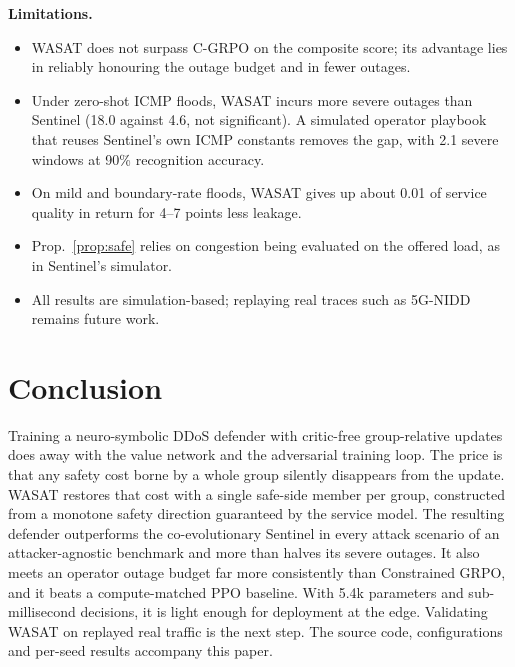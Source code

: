 \documentclass[conference]{IEEEtran}
\begin{document}
\textbf{Limitations.}
\begin{itemize}
\item WASAT does not surpass C-GRPO on the composite score; its advantage lies in reliably honouring the outage budget and in fewer outages.
\item Under zero-shot ICMP floods, WASAT incurs more severe outages than Sentinel (18.0 against 4.6, not significant). A simulated operator playbook that reuses Sentinel's own ICMP constants removes the gap, with 2.1 severe windows at 90\% recognition accuracy.
\item On mild and boundary-rate floods, WASAT gives up about 0.01 of service quality in return for 4--7 points less leakage.
\item Prop.~\ref{prop:safe} relies on congestion being evaluated on the offered load, as in Sentinel's simulator.
\item All results are simulation-based; replaying real traces such as 5G-NIDD remains future work.
\end{itemize}

\section{Conclusion}
Training a neuro-symbolic DDoS defender with critic-free group-relative updates does away with the value network and the adversarial training loop. The price is that any safety cost borne by a whole group silently disappears from the update. WASAT restores that cost with a single safe-side member per group, constructed from a monotone safety direction guaranteed by the service model. The resulting defender outperforms the co-evolutionary Sentinel in every attack scenario of an attacker-agnostic benchmark and more than halves its severe outages. It also meets an operator outage budget far more consistently than Constrained GRPO, and it beats a compute-matched PPO baseline. With 5.4k parameters and sub-millisecond decisions, it is light enough for deployment at the edge. Validating WASAT on replayed real traffic is the next step. The source code, configurations and per-seed results accompany this paper.



\end{document}
